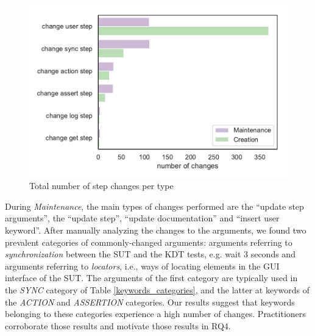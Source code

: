 \begin{figure}
\centering
\includegraphics[width=0.7\columnwidth]{figures/evolution/changes_categories.pdf}
\caption{Total number of step changes per type}  
\label{fig:changes_steps}
\end{figure}

During \emph{Maintenance}, the main types of changes performed are the ``update step arguments'', the ``update step'', ``update documentation'' and ``insert user keyword''. After manually analyzing the changes to the arguments, we found two prevalent categories of commonly-changed arguments: arguments referring to \emph{synchronization} between the SUT and the KDT tests, e.g. wait 3 seconds and arguments referring to \emph{locators}, i.e., ways of locating elements in the GUI interface of the SUT. The arguments of the first category are typically used in the \emph{SYNC} category of Table \ref{keywords_categories}, and the latter at keywords of the \emph{ACTION} and \emph{ASSERTION} categories. Our results suggest that keywords belonging to these categories experience a high number of changes. Practitioners corroborate those results and motivate those results in RQ4.

